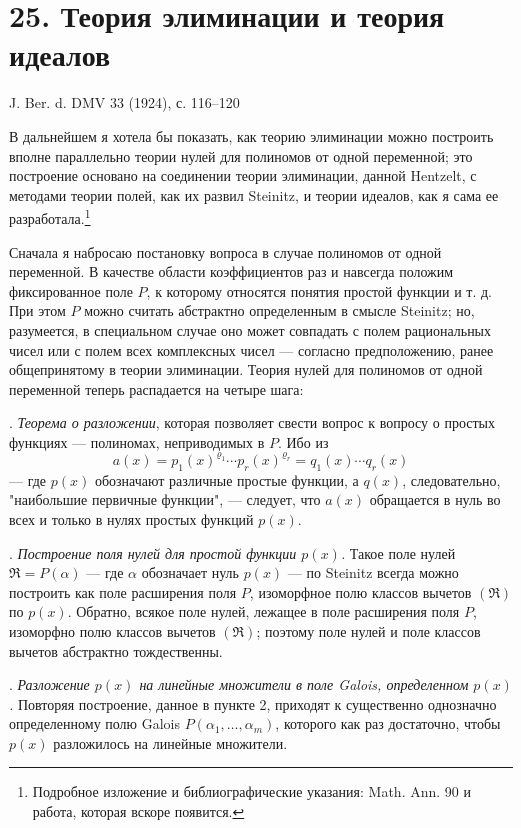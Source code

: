 \documentclass[11pt]{article}
\providecommand{\frakR}{\mathfrak R}
\begin{document}
\setcounter{footnote}{0}

\section*{25. Теория элиминации и теория идеалов}

\begin{center}
J. Ber. d. DMV 33 (1924), с. 116--120
\end{center}

В дальнейшем я хотела бы показать, как теорию элиминации можно построить вполне параллельно теории нулей для полиномов от одной переменной; это построение основано на соединении теории элиминации, данной Hentzelt, с методами теории полей, как их развил Steinitz, и теории идеалов, как я сама ее разработала.\footnote{Подробное изложение и библиографические указания: Math. Ann. 90 и работа, которая вскоре появится.}

Сначала я набросаю постановку вопроса в случае полиномов от одной переменной. В качестве области коэффициентов раз и навсегда положим фиксированное поле $P$, к которому относятся понятия простой функции и т. д. При этом $P$ можно считать абстрактно определенным в смысле Steinitz; но, разумеется, в специальном случае оно может совпадать с полем рациональных чисел или с полем всех комплексных чисел --- согласно предположению, ранее общепринятому в теории элиминации. Теория нулей для полиномов от одной переменной теперь распадается на четыре шага:

. \emph{Теорема о разложении}, которая позволяет свести вопрос к вопросу о простых функциях --- полиномах, неприводимых в $P$. Ибо из
\[
 a(x)=p_1(x)^{\varrho_1}\cdots p_r(x)^{\varrho_r}=q_1(x)\cdots q_r(x)
\]
--- где $p(x)$ обозначают различные простые функции, а $q(x)$, следовательно, "наибольшие первичные функции", --- следует, что $a(x)$ обращается в нуль во всех и только в нулях простых функций $p(x)$.

. \emph{Построение поля нулей для простой функции $p(x)$.} Такое поле нулей $\frakR=P(\alpha)$ --- где $\alpha$ обозначает нуль $p(x)$ --- по Steinitz всегда можно построить как поле расширения поля $P$, изоморфное полю классов вычетов $(\frakR)$ по $p(x)$. Обратно, всякое поле нулей, лежащее в поле расширения поля $P$, изоморфно полю классов вычетов $(\frakR)$; поэтому поле нулей и поле классов вычетов абстрактно тождественны.

. \emph{Разложение $p(x)$ на линейные множители в поле Galois, определенном $p(x)$.} Повторяя построение, данное в пункте 2, приходят к существенно однозначно определенному полю Galois $P(\alpha_1,\ldots,\alpha_m)$, которого как раз достаточно, чтобы $p(x)$ разложилось на линейные множители.
\end{document}
